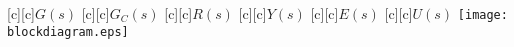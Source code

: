 \documentclass[12pt]{article}
\begin{document}
\begin{psfrags}
    [c][c]{\small $G(s)$}
    [c][c]{\small $G_C(s)$}
    [c][c]{\footnotesize $R(s)$}
    [c][c]{\footnotesize $Y(s)$}
    [c][c]{\footnotesize $E(s)$}
    [c][c]{\footnotesize $U(s)$}
    \texttt{[image: blockdiagram.eps]}
\end{psfrags}
\end{document}
